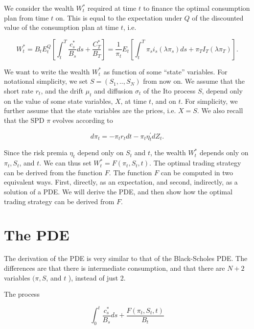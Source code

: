 \documentclass[\topdir/lecture\_notes.tex]{subfiles}
\begin{document}
We consider the wealth \(W_{t}^{*}\) required at time \(t\) to finance the optimal consumption plan from time \(t\) on. This is equal to the expectation under \(Q\) of the discounted value of the consumption plan at time \(t\), i.e.

\begin{equation}
W_{t}^{*}=B_{t} E_{t}^{Q}\left[\int_{t}^{T} \frac{c_{s}^{*}}{B_{s}} d s+\frac{C_{T}^{*}}{B_{T}}\right]=\frac{1}{\pi_{t}} E_{t}\left[\int_{t}^{T} \pi_{s} i_{s}\left(\lambda \pi_{s}\right) d s+\pi_{T} I_{T}\left(\lambda \pi_{T}\right)\right] . \label{eq:6.5.30}
\end{equation}

We want to write the wealth \(W_{t}^{*}\) as function of some ``state'' variables. For notational simplicity, we set \(S=\left(S_{1}, . ., S_{N}\right)\) from now on. We assume that the short rate \(r_{t}\), and the drift \(\mu_{t}\) and diffusion \(\sigma_{t}\) of the Ito process \(S\), depend only on the value of some state variables, \(X\), at time \(t\), and on \(t\). For simplicity, we further assume that the state variables are the prices, i.e. \(X=S\). We also recall that the SPD \(\pi\) evolves according to

\begin{equation}
d \pi_{t}=-\pi_{t} r_{t} d t-\pi_{t} \eta_{t}^{\prime} d Z_{t} . \label{eq:6.5.31}
\end{equation}

Since the risk premia \(\eta_{t}\) depend only on \(S_{t}\) and \(t\), the wealth \(W_{t}^{*}\) depends only on \(\pi_{t}, S_{t}\), and \(t\). We can thus set \(W_{t}^{*}=F\left(\pi_{t}, S_{t}, t\right)\). The optimal trading strategy can be derived from the function \(F\). The function \(F\) can be computed in two equivalent ways. First, directly, as an expectation, and second, indirectly, as a solution of a PDE. We will derive the PDE, and then show how the optimal trading strategy can be derived from \(F\).

\section{The PDE}
The derivation of the PDE is very similar to that of the Black-Scholes PDE. The differences are that there is intermediate consumption, and that there are \(N+2\) variables \((\pi, S\), and \(t\) ), instead of just 2.

The process

\begin{equation}
\int_{0}^{t} \frac{c_{s}^{*}}{B_{s}} d s+\frac{F\left(\pi_{t}, S_{t}, t\right)}{B_{t}}
\end{equation}
\end{document}
